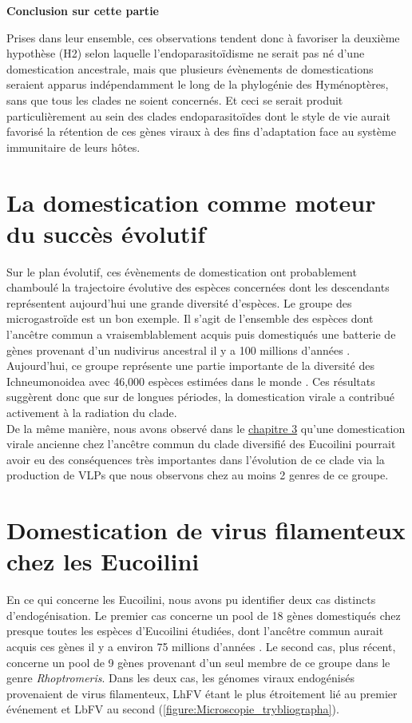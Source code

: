 \textbf{Conclusion sur cette partie}

Prises dans leur ensemble, ces observations tendent donc à favoriser la deuxième hypothèse (H2) selon laquelle l'endoparasitoïdisme ne serait pas né d'une domestication ancestrale, mais que plusieurs évènements de domestications seraient apparus indépendamment le long de la phylogénie des Hyménoptères, sans que tous les clades ne soient concernés. Et ceci se serait produit particulièrement au sein des clades endoparasitoïdes dont le style de vie aurait favorisé la rétention de ces gènes viraux à des fins d'adaptation face au système immunitaire de leurs hôtes.  


\section{La domestication comme moteur du succès évolutif}

Sur le plan évolutif, ces évènements de domestication ont probablement chamboulé la trajectoire évolutive des espèces concernées dont les descendants représentent aujourd'hui une grande diversité d'espèces. Le groupe des microgastroïde est un bon exemple. Il s'agit de l'ensemble des espèces dont l'ancêtre commun a vraisemblablement acquis puis domestiqués une batterie de gènes provenant d'un nudivirus ancestral il y a 100 millions d'années \citep{murphy_phylogeny_2008, whitfield_estimating_2002,banks_dissecting_2006}. Aujourd'hui, ce groupe représente une partie importante de la diversité des Ichneumonoidea avec 46,000 espèces estimées dans le monde \citep{rodriguez_extrapolations_2013}. 
Ces résultats suggèrent donc que sur de longues périodes, la domestication virale a contribué activement à la radiation du clade.\\
De la même manière, nous avons observé dans le \hyperref[sec:chap3]{chapitre 3} qu'une domestication virale ancienne chez l'ancêtre commun du clade diversifié des Eucoilini pourrait avoir eu des conséquences très importantes dans l'évolution de ce clade via la production de VLPs que nous observons chez au moins 2 genres de ce groupe. \\

\section{Domestication de virus filamenteux chez les Eucoilini}

En ce qui concerne les Eucoilini, nous avons pu identifier deux cas distincts d'endogénisation. Le premier cas concerne un pool de 18 gènes domestiqués chez presque toutes les espèces d'Eucoilini étudiées, dont l'ancêtre commun aurait acquis ces gènes il y a environ 75 millions d'années \citep{blaimer_comprehensive_2020}. Le second cas, plus récent, concerne un pool de 9 gènes provenant d'un seul membre de ce groupe dans le genre \textit{Rhoptromeris}. Dans les deux cas, les génomes viraux endogénisés provenaient de virus filamenteux, LhFV étant le plus étroitement lié au premier événement et LbFV au second (\figurename{\ref{figure:Microscopie_trybliographa}}).

